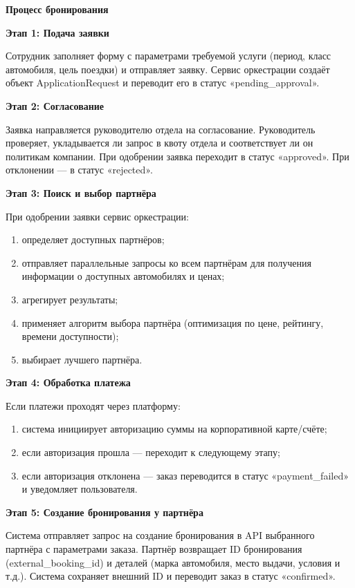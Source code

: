\documentclass{bmstu}
\begin{document}
\begin{center}
    \textbf{Процесс бронирования}
\end{center}

\textbf{Этап 1: Подача заявки}

Сотрудник заполняет форму с параметрами требуемой услуги (период, класс автомобиля, цель поездки) и отправляет заявку. Сервис оркестрации создаёт объект ApplicationRequest и переводит его в статус «pending\_approval».

\textbf{Этап 2: Согласование}

Заявка направляется руководителю отдела на согласование. Руководитель проверяет, укладывается ли запрос в квоту отдела и соответствует ли он политикам компании. При одобрении заявка переходит в статус «approved». При отклонении — в статус «rejected».

\textbf{Этап 3: Поиск и выбор партнёра}

При одобрении заявки сервис оркестрации:
\begin{enumerate}
    \item определяет доступных партнёров;
    \item отправляет параллельные запросы ко всем партнёрам для получения информации о доступных автомобилях и ценах;
    \item агрегирует результаты;
    \item применяет алгоритм выбора партнёра (оптимизация по цене, рейтингу, времени доступности);
    \item выбирает лучшего партнёра.
\end{enumerate}

\textbf{Этап 4: Обработка платежа}

Если платежи проходят через платформу:
\begin{enumerate}
    \item система инициирует авторизацию суммы на корпоративной карте/счёте;
    \item если авторизация прошла — переходит к следующему этапу;
    \item если авторизация отклонена — заказ переводится в статус «payment\_failed» и уведомляет пользователя.
\end{enumerate}

\textbf{Этап 5: Создание бронирования у партнёра}

Система отправляет запрос на создание бронирования в API выбранного партнёра с параметрами заказа. Партнёр возвращает ID бронирования (external\_booking\_id) и деталей (марка автомобиля, место выдачи, условия и т.д.). Система сохраняет внешний ID и переводит заказ в статус «confirmed».
\end{document}
